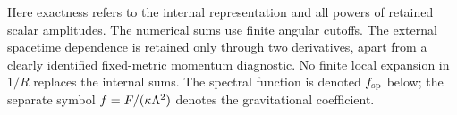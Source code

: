 \documentclass[11pt,letterpaper]{article}
\begin{document}
Here exactness refers to the internal representation and all powers of retained scalar amplitudes. The numerical sums use finite angular cutoffs. The external spacetime dependence is retained only through two derivatives, apart from a clearly identified fixed-metric momentum diagnostic. No finite local expansion in $1/R$ replaces the internal sums. The spectral function is denoted $f_{\rm sp}$ below; the separate symbol $f=F/(\kappa\Lambda^2)$ denotes the gravitational coefficient.



\clearpage

\end{document}
